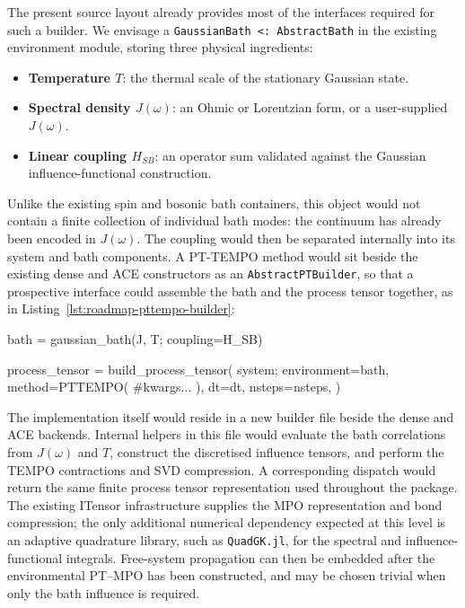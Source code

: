 The present source layout already provides most of the interfaces required for such a builder.
We envisage a \texttt{GaussianBath <: AbstractBath} in the existing environment module, storing three physical ingredients:
%
\begin{itemize}
    \item \textbf{Temperature $T$}: the thermal scale of the stationary Gaussian state.
    \item \textbf{Spectral density $J(\omega)$}: an Ohmic or Lorentzian form, or a user-supplied $J(\omega)$.
    \item \textbf{Linear coupling $H_{SB}$}: an operator sum validated against the Gaussian influence-functional construction.
\end{itemize}
%
Unlike the existing spin and bosonic bath containers, this object would not contain a finite collection of individual bath modes: the continuum has already been encoded in $J(\omega)$.
The coupling would then be separated internally into its system and bath components.
A PT-TEMPO method would sit beside the existing dense and ACE constructors as an \texttt{AbstractPTBuilder}, so that a prospective interface could assemble the bath and the process tensor together, as in Listing~\ref{lst:roadmap-pttempo-builder}:
%
\begin{juliacode}[
    caption={Prospective Gaussian-bath constructor and PT-TEMPO process tensor builder.},
    label={lst:roadmap-pttempo-builder},
]
bath = gaussian_bath(J, T; coupling=H_SB)

process_tensor = build_process_tensor(
    system;
    environment=bath,
    method=PTTEMPO(
        #kwargs...
    ),
    dt=dt,
    nsteps=nsteps,
)
\end{juliacode}
%
The implementation itself would reside in a new builder file beside the dense and ACE backends.
Internal helpers in this file would evaluate the bath correlations from $J(\omega)$ and $T$, construct the discretised influence tensors, and perform the TEMPO contractions and SVD compression.
A corresponding dispatch would return the same finite process tensor representation used throughout the package.
The existing ITensor infrastructure supplies the MPO representation and bond compression; the only additional numerical dependency expected at this level is an adaptive quadrature library, such as \texttt{QuadGK.jl}, for the spectral and influence-functional integrals.
Free-system propagation can then be embedded after the environmental PT--MPO has been constructed, and may be chosen trivial when only the bath influence is required.

